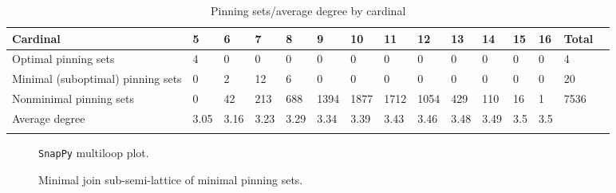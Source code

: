 \documentclass{article}%
\begin{document}
\begin{table}[ht]
	\caption{Pinning sets/average degree by cardinal}
	\centering
	\renewcommand{\arraystretch}{1.5}
	\begin{tabularx}{\textwidth}{lXXXXXXXXXXXXXX}
		\toprule
			Cardinal & 5 & 6 & 7 & 8 & 9 & 10 & 11 & 12 & 13 & 14 & 15 & 16 & Total\\
			\hline
			Optimal pinning sets & 4 & 0 & 0 & 0 & 0 & 0 & 0 & 0 & 0 & 0 & 0 & 0 & 4 \\
			Minimal (suboptimal) pinning sets & 0 & 2 & 12 & 6 & 0 & 0 & 0 & 0 & 0 & 0 & 0 & 0 & 20 \\
			Nonminimal pinning sets & 0 & 42 & 213 & 688 & 1394 & 1877 & 1712 & 1054 & 429 & 110 & 16 & 1 & 7536 \\
			Average degree & 3.05 & 3.16 & 3.23 & 3.29 & 3.34 & 3.39 & 3.43 & 3.46 & 3.48 & 3.49 & 3.5 & 3.5 &  \\
		\bottomrule \\ 
	\end{tabularx}
\end{table}

\begin{multicols}{2}
\begin{figure}[H]
\centering

\caption{\texttt{SnapPy} multiloop plot.}
\label{fig:tex/img/[[15, 24, 16, 1], [14, 9, 15, 10], [23, 8, 24, 9], [16, 12, 17, 11], [1, 11, 2, 10], [22, 13, 23, 14], [7, 12, 8, 13], [17, 7, 18, 6], [2, 21, 3, 22], [18, 25, 19, 28], [5, 27, 6, 28], [20, 26, 21, 27.svg}
\end{figure}
\columnbreak

\begin{figure}[H]
\centering
\scalebox{0.8}{}
\caption{Minimal join sub-semi-lattice of minimal pinning sets.}
\label{fig:tex/img/[[15, 24, 16, 1], [14, 9, 15, 10], [23, 8, 24, 9], [16, 12, 17, 11], [1, 11, 2, 10], [22, 13, 23, 14], [7, 12, 8, 13], [17, 7, 18, 6], [2, 21, 3, 22], [18, 25, 19, 28], [5, 27, 6, 28], [20, 26, 21, 27.pgf}
\end{figure}
\end{multicols}
\end{document}
